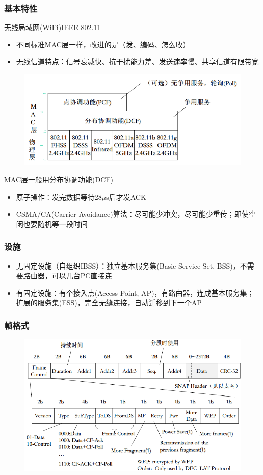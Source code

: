 \subsubsection{基本特性}
无线局域网(WiFi)IEEE 802.11
\begin{itemize}
\item 不同标准MAC层一样，改进的是（发、编码、怎么收）
\item 无线信道特点：信号衰减快、抗干扰能力差、发送速率慢、共享信道有限带宽
\end{itemize}
\begin{figure}[H]
    \centering
    \includegraphics[width=0.6\linewidth]{fig/802-11.png}
\end{figure}

MAC层一般用分布协调功能(DCF)
\begin{itemize}
\item 原子操作：发完数据等待28$\mu$s后才发ACK
\item CSMA/CA(Carrier Avoidance)算法：尽可能少冲突，尽可能少重传；即使空闲也要随机等一段时间
\end{itemize}

\subsubsection{设施}
\begin{itemize}
\item 无固定设施（自组织IBSS）：独立基本服务集(Basic Service Set, BSS)，不需要路由器，可以几台PC直接连
\item 有固定设施：有个接入点(Access Point, AP)，有路由器，连成基本服务集；
扩展的服务集(ESS)，完全无缝连接，自动迁移到下一个AP
\end{itemize}

\subsubsection{帧格式}
\begin{figure}[H]
    \centering
    \includegraphics[width=0.8\linewidth]{fig/802-11-frame.png}
\end{figure}

